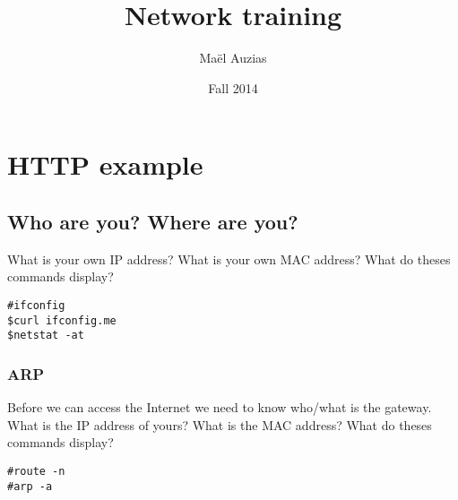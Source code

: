 \documentclass[11pt]{article}
\begin{document}
\title{Network training}
\date{Fall 2014}
\author{Maël Auzias}
\maketitle

\tableofcontents
\pagebreak


\section{HTTP example}
\subsection{Who are you? Where are you?}
What is your own IP address? What is your own MAC address? What do theses commands display?
\begin{lstlisting}
#ifconfig
$curl ifconfig.me
$netstat -at
\end{lstlisting}

\subsubsection{ARP}
Before we can access the Internet we need to know who/what is the gateway. What is the IP address of yours? What is the MAC address? What do theses commands display?
\begin{lstlisting}
#route -n
#arp -a
\end{lstlisting}
\end{document}

